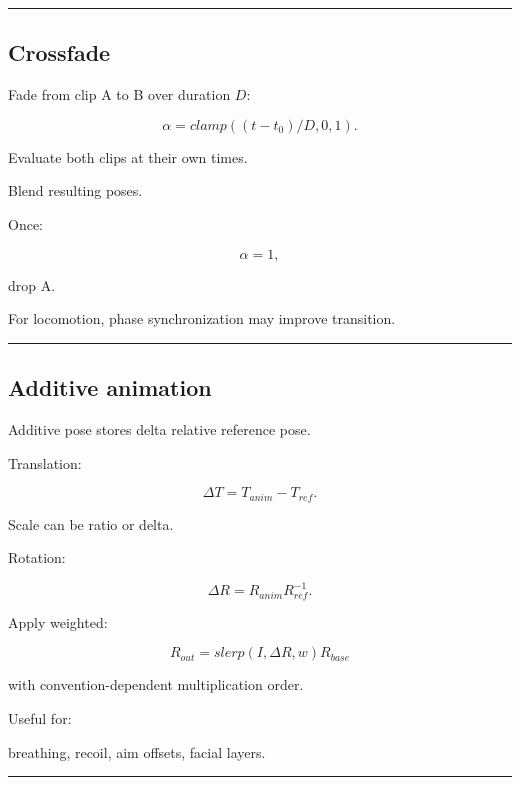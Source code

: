 \begin{center}\rule{0.5\linewidth}{0.5pt}\end{center}

\subsection{Crossfade}\label{04-visual-computing-ii-ch041-crossfade}

\hypertarget{04-visual-computing-ii-ch041-crossfade}{}

Fade from clip A to B over duration \(D\):

\[
\alpha=
clamp(
(t-t_0)/D,
0,1
).
\]

Evaluate both clips at their own times.

Blend resulting poses.

Once:

\[
\alpha=1,
\]

drop A.

For locomotion, phase synchronization may improve transition.

\begin{center}\rule{0.5\linewidth}{0.5pt}\end{center}

\subsection{Additive animation}\label{04-visual-computing-ii-ch041-additive-animation}

\hypertarget{04-visual-computing-ii-ch041-additive-animation}{}

Additive pose stores delta relative reference pose.

Translation:

\[
\Delta T=
T_{anim}-T_{ref}.
\]

Scale can be ratio or delta.

Rotation:

\[
\Delta R=
R_{anim}R_{ref}^{-1}.
\]

Apply weighted:

\[
R_{out}
=
slerp(
I,
\Delta R,
w
)
R_{base}
\]

with convention-dependent multiplication order.

Useful for:

breathing, recoil, aim offsets, facial layers.

\begin{center}\rule{0.5\linewidth}{0.5pt}\end{center}

